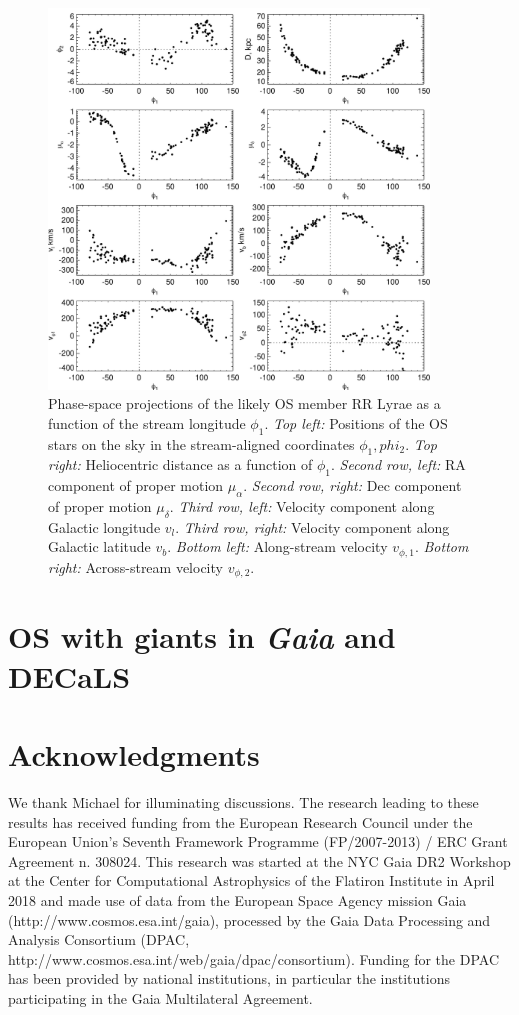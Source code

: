 \documentclass[a4paper,useAMS,usenatbib]{mnras}
\newcommand{\gaia}{\textit{Gaia} }
\begin{document}
%
\begin{figure}
  \centering
  \includegraphics[width=0.9\textwidth]{orphan_paper_phi1_members.pdf}
  \caption[]{Phase-space projections of the likely OS member RR Lyrae
    as a function of the stream longitude $\phi_1$. {\it Top left:}
    Positions of the OS stars on the sky in the stream-aligned
    coordinates $\phi_1, phi_2$. {\it Top right:} Heliocentric
    distance as a function of $\phi_1$. {\it Second row, left:} RA
    component of proper motion $\mu_{\alpha}$. {\it Second row,
      right:} Dec component of proper motion $\mu_{\delta}$. {\it
      Third row, left:} Velocity component along Galactic longitude
    $v_l$. {\it Third row, right:} Velocity component along Galactic
    latitude $v_b$. {\it Bottom left:} Along-stream velocity
    $v_{\phi,1}$. {\it Bottom right:} Across-stream velocity
    $v_{\phi,2}$.}
   \label{fig:memother}
\end{figure}
%

\section{OS with giants in \gaia and DECaLS}


\section*{Acknowledgments}

We thank Michael for illuminating discussions. The research leading to
these results has received funding from the European Research Council
under the European Union's Seventh Framework Programme (FP/2007-2013)
/ ERC Grant Agreement n. 308024. This research was started at the NYC
Gaia DR2 Workshop at the Center for Computational Astrophysics of the
Flatiron Institute in April 2018 and made use of data from the
European Space Agency mission Gaia (http://www.cosmos.esa.int/gaia),
processed by the Gaia Data Processing and Analysis Consortium (DPAC,
http://www.cosmos.esa.int/web/gaia/dpac/consortium). Funding for the
DPAC has been provided by national institutions, in particular the
institutions participating in the Gaia Multilateral Agreement.



\label{lastpage}
\end{document}
